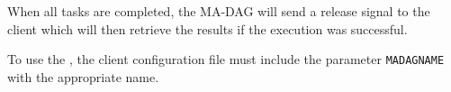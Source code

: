 When all tasks are completed, the MA-DAG will send a release signal
to the client which will then retrieve the results if the execution
was successful.

To use the \madag, the client configuration file must include
the parameter \texttt{MADAGNAME} with the appropriate name.

%
%
%
%
%
%
%
%
